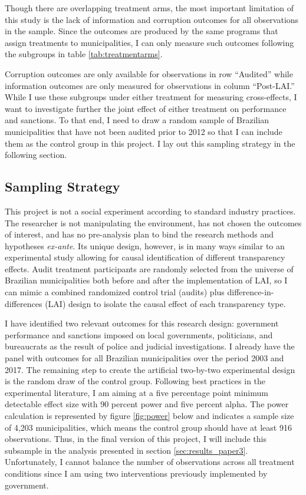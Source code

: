 \documentclass[11pt]{article}
\begin{document}
Though there are overlapping treatment arms, the most important limitation of this study is the lack of information and corruption outcomes for all observations in the sample. Since the outcomes are produced by the same programs that assign treatments to municipalities, I can only measure such outcomes following the subgroups in table \ref{tab:treatmentarms}.



Corruption outcomes are only available for observations in row ``Audited'' while information outcomes are only measured for observations in column ``Post-LAI.'' While I use these subgroups under either treatment for measuring cross-effects, I want to investigate further the joint effect of either treatment on performance and sanctions. To that end, I need to draw a random sample of Brazilian municipalities that have not been audited prior to 2012 so that I can include them as the control group in this project. I lay out this sampling strategy in the following section.

\subsection{Sampling Strategy} \label{sec:sampling_paper3}

This project is not a social experiment according to standard industry practices. The researcher is not manipulating the environment, has not chosen the outcomes of interest, and has no pre-analysis plan to bind the research methods and hypotheses \emph{ex-ante}. Its unique design, however, is in many ways similar to an experimental study allowing for causal identification of different transparency effects. Audit treatment participants are randomly selected from the universe of Brazilian municipalities both before and after the implementation of LAI, so I can mimic a combined randomized control trial (audits) plus difference-in-differences (LAI) design to isolate the causal effect of each transparency type.

I have identified two relevant outcomes for this research design: government performance and sanctions imposed on local governments, politicians, and bureaucrats as the result of police and judicial investigations. I already have the panel with outcomes for all Brazilian municipalities over the period 2003 and 2017. The remaining step to create the artificial two-by-two experimental design is the random draw of the control group. Following best practices in the experimental literature, I am aiming at a five percentage point minimum detectable effect size with 90 percent power and five percent alpha. The power calculation is represented by figure \ref{fig:power} below and indicates a sample size of 4,203 municipalities, which means the control group should have at least 916 observations. Thus, in the final version of this project, I will include this subsample in the analysis presented in section \ref{sec:results_paper3}. Unfortunately, I cannot balance the number of observations across all treatment conditions since I am using two interventions previously implemented by government.
\end{document}
